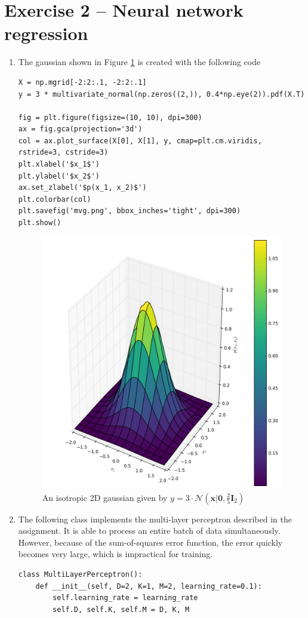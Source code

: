 \documentclass[a4paper]{article}
\begin{document}
\pagebreak
\section*{Exercise 2 -- Neural network regression} %
\begin{enumerate}
\item The gaussian shown in Figure \ref{fig:mvg} is created with the following code
\begin{lstlisting}
X = np.mgrid[-2:2:.1, -2:2:.1]
y = 3 * multivariate_normal(np.zeros((2,)), 0.4*np.eye(2)).pdf(X.T)

fig = plt.figure(figsize=(10, 10), dpi=300)
ax = fig.gca(projection='3d')
col = ax.plot_surface(X[0], X[1], y, cmap=plt.cm.viridis, rstride=3, cstride=3)
plt.xlabel('$x_1$')
plt.ylabel('$x_2$')
ax.set_zlabel('$p(x_1, x_2)$')
plt.colorbar(col)
plt.savefig('mvg.png', bbox_inches='tight', dpi=300)
plt.show()
\end{lstlisting}
\begin{figure}
\centering
\includegraphics[width=.8\linewidth]{figures/mvg.png}
\caption{An isotropic 2D gaussian given by $y = 3 \cdot \mathcal{N}(\bm{x}|\bm{0}, \frac{2}{5}\bm{I}_2)$}
\label{fig:mvg}
\end{figure}
\item The following class implements the multi-layer perceptron described in the assignment. It is able to process an entire batch of data simultaneously. However, because of the sum-of-squares error function, the error quickly becomes very large, which is impractical for training.
\begin{lstlisting}
class MultiLayerPerceptron():
    def __init__(self, D=2, K=1, M=2, learning_rate=0.1):
        self.learning_rate = learning_rate
        self.D, self.K, self.M = D, K, M
        

\end{lstlisting}
\end{enumerate}
\end{document}
